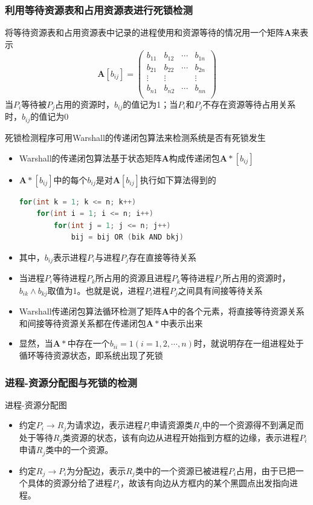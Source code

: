 \documentclass[cs4size,a4paper,10pt]{ctexart}
\begin{document}
	\subsubsection{利用等待资源表和占用资源表进行死锁检测}
	将等待资源表和占用资源表中记录的进程使用和资源等待的情况用一个矩阵$\boldsymbol{A}$来表示
	$$
	\boldsymbol{A}[b_{ij}]=\left(
		\begin{array}{cccc}
			b_{11} & b_{12} & \cdots & b_{1n} \\
			b_{21} & b_{22} & \cdots & b_{2n} \\
			\vdots & \vdots &        & \vdots \\
			b_{n1} & b_{n2} & \cdots & b_{nn} \\
		\end{array}
	\right)
	$$
	当$P_i$等待被$P_j$占用的资源时，$b_{ij}$的值记为1；当$P_i$和$P_j$不存在资源等待占用关系时，$b_{ij}$的值记为0

	死锁检测程序可用Warshall的传递闭包算法来检测系统是否有死锁发生
	\begin{itemize}
		\item Warshall的传递闭包算法基于状态矩阵$\boldsymbol{A}$构成传递闭包$\boldsymbol{A} *[b_{ij}]$
		\item $\boldsymbol{A} *[b_{ij}]$中的每个$b_{ij}$是对$\boldsymbol{A}[b_{ij}]$执行如下算法得到的
		\begin{lstlisting}[language=C, keywordstyle=\color{black}]
for(int k = 1; k <= n; k++)
	for(int i = 1; i <= n; i++)
    	for(int j = 1; j <= n; j++)
			bij = bij OR (bik AND bkj)
		\end{lstlisting}
		\item 其中，$b_{ij}$表示进程$P_i$与进程$P_j$存在直接等待关系
		\item 当进程$P_i$等待进程$P_k$所占用的资源且进程$P_k$等待进程$P_j$所占用的资源时，$b_{ik} \land b_{kj} $取值为1。也就是说，进程$P_i$进程$P_j$之间具有间接等待关系
		\item Warshall传递闭包算法循环检测了矩阵$\boldsymbol{A}$中的各个元素，将直接等待资源关系和间接等待资源关系都在传递闭包$\boldsymbol{A}*$中表示出来
		\item 显然，当$\boldsymbol{A}*$中存在一个$b_{ii} = 1(i=1,2,\cdots,n)$时，就说明存在一组进程处于循环等待资源状态，即系统出现了死锁
	\end{itemize}


	\subsubsection{进程-资源分配图与死锁的检测}
	进程-资源分配图
	\begin{itemize}
		\item 约定$P_i \to R_j$为请求边，表示进程$P_i$申请资源类$R_j$中的一个资源得不到满足而处于等待$R_j$类资源的状态，该有向边从进程开始指到方框的边缘，表示进程$P_i$申请$R_j$类中的一个资源。
		\item 约定$R_j \to P_i$为分配边，表示$R_j$类中的一个资源已被进程$P_i$占用，由于已把一个具体的资源分给了进程$P_i$，故该有向边从方框内的某个黑圆点出发指向进程。
	\end{itemize}
\end{document}
